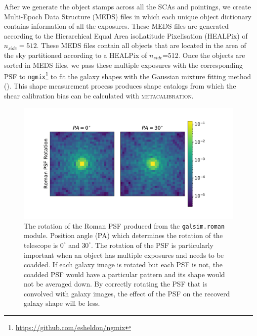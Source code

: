 \documentclass[fleqn,usenatbib]{mnras}
\begin{document}
After we generate the object stamps across all the SCAs and pointings, we create Multi-Epoch Data Structure (MEDS) files in which each unique object dictionary contains information of all the exposures. These MEDS files are generated according to the Hierarchical Equal Area isoLatitude Pixelisation (HEALPix) of $n_{side}=512$. These MEDS files contain all objects that are located in the area of the sky partitioned according to a HEALPix of $n_{side}$=512. Once the objects are sorted in MEDS files, we pass these multiple exposures with the corresponding PSF to \texttt{ngmix}\footnote{\url{ https://github.com/esheldon/ngmix}} to fit the galaxy shapes with the Gaussian mixture fitting method (\citealt{2014MNRAS.444L..25S}). This shape measurement process produces shape catalogs from which the shear calibration bias can be calculated with \textsc{metacalibration}.

\begin{figure}
	\includegraphics[width=\columnwidth]{figure1.pdf}
	\vspace*{-3mm}
    \caption{The rotation of the Roman PSF produced from the \texttt{galsim.roman} module. Position angle (PA) which determines the rotation of the telescope is $0^{\circ}$ and $30^{\circ}$. The rotation of the PSF is particularly important when an object has multiple exposures and needs to be coadded. If each galaxy image is rotated but each PSF is not, the coadded PSF would have a particular pattern and its shape would not be averaged down. By correctly rotating the PSF that is convolved with galaxy images, the effect of the PSF on the recoverd galaxy shape will be less.}
    \label{fig:psfrot}
\end{figure}
\end{document}
